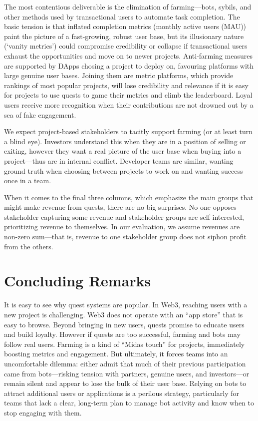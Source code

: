 The most contentious deliverable is the elimination of farming---bots, sybils, and other methods used by transactional users to automate task completion. The basic tension is that inflated completion metrics (\eg monthly active users (MAU)) paint the picture of a fast-growing, robust user base, but its illusionary nature (`vanity metrics') could compromise credibility or collapse if transactional users exhaust the opportunities and move on to newer projects. Anti-farming measures are supported by DApps chosing a project to deploy on, favouring platforms with large genuine user bases. Joining them are metric platforms, which provide rankings of most popular projects, will lose credibility and relevance if it is easy for projects to use quests to game their metrics and climb the leaderboard. Loyal users receive more recognition when their contributions are not drowned out by a sea of fake engagement.

We expect project-based stakeholders to tacitly support farming (or at least turn a blind eye). Investors understand this when they are in a position of selling or exiting, however they want a real picture of the user base when buying into a project---thus are in internal conflict. Developer teams are similar, wanting ground truth when choosing between projects to work on and wanting success once in a team. 

When it comes to the final three columns, which emphasize the main groups that might make revenue from quests, there are no big surprises. No one opposes stakeholder capturing some revenue and stakeholder groups are self-interested, prioritizing revenue to themselves. In our evaluation, we assume revenues are non-zero sum---that is, revenue to one stakeholder group does not siphon profit from the others.


\section{Concluding Remarks}

It is easy to see why quest systems are popular. In Web3, reaching users with a new project is challenging. Web3 does not operate with an ``app store'' that is easy to browse. Beyond bringing in new users, quests promise to educate users and build loyalty. However if quests are too successful, farming and bots may follow real users. Farming is a kind of ``Midas touch'' for projects, immediately boosting metrics and engagement. But ultimately, it forces teams into an uncomfortable dilemma: either admit that much of their previous participation came from bots—risking tension with partners, genuine users, and investors—or remain silent and appear to lose the bulk of their user base. Relying on bots to attract additional users or applications is a perilous strategy, particularly for teams that lack a clear, long-term plan to manage bot activity and know when to stop engaging with them.





